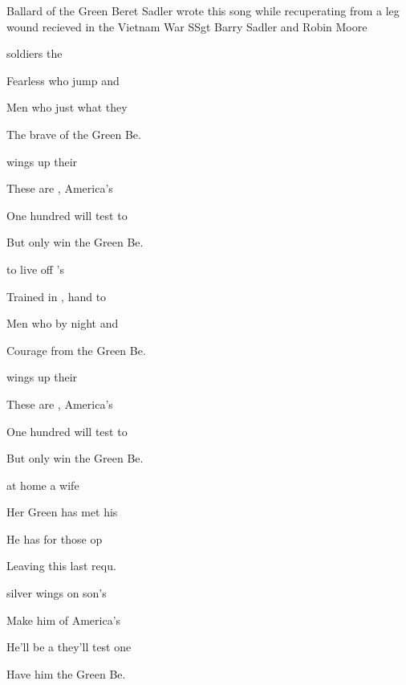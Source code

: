 \begin{SBSong}{Ballard of the Green Beret}
  {Sadler wrote this song while recuperating from a leg wound recieved in the Vietnam War}
  {SSgt Barry Sadler and Robin Moore}
  \begin{SBVerse}
     soldiers  the 

    Fearless  who jump and 

    Men who  just what they 

    The brave  of the Green Be.
  \end{SBVerse}
  \begin{SBVerse}
     wings up their 

    These are , America's 

    One hundred  will test to

    But only  win the Green Be.
  \end{SBVerse}
  \begin{SBVerse}
     to live off 's 

    Trained in , hand to 

    Men who  by night and 

    Courage  from the Green Be.
  \end{SBVerse}
  \begin{SBVerse}
     wings up their 

    These are , America's 

    One hundred  will test to

    But only  win the Green Be.
  \end{SBVerse}
  \begin{SBVerse}
     at home a  wife 

    Her Green  has met his 

    He has  for those op

    Leaving  this last requ.
  \end{SBVerse}
  \begin{SBVerse}
     silver wings on  son's 

    Make him  of America's 

    He'll be a  they'll test one 

    Have him  the Green Be.  
  \end{SBVerse}
\end{SBSong}
